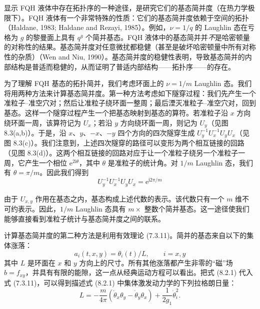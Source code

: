 显示 FQH 液体中存在拓扑序的一种途径，是研究它们的基态简并度（在热力学极限下）。FQH 液体有一个非常特殊的性质：它们的基态简并度依赖于空间的拓扑（Haldane, 1983; Haldane and Rezayi, 1985）。例如，$\nu = 1/q$ 的 Laughlin 态在亏格为 $g$ 的黎曼面上具有 $q^g$ 个简并基态。FQH 液体中的基态简并并\emph{不}是哈密顿量的对称性的结果。基态简并度对任意微扰都稳健（甚至是破坏哈密顿量中所有对称性的杂质）（Wen and Niu, 1990）。基态简并度的稳健性表明，导致基态简并的内部结构是普适而稳健的，从而证明了普适内部结构——拓扑序——的存在。

为了理解 FQH 基态的拓扑简并，我们考虑环面上的 $\nu = 1/m$ Laughlin 态。我们将用两种方法来计算基态简并度。第一种方法考虑如下隧穿过程：我们先产生一个准粒子--准空穴对；然后让准粒子绕环面一整周；最后湮灭准粒子--准空穴对，回到基态。这样一个隧穿过程产生一个把基态映射到基态的算符。若准粒子沿 $x$ 方向绕环面一周，该算符记为 $U_x$；若沿 $y$ 方向绕环面一周，则记为 $U_y$（见图 8.3(a,b)）。于是，沿 $x$、$y$、$-x$、$-y$ 四个方向的四次隧穿生成 $U_y^{-1}U_x^{-1}U_yU_x$（见图 8.3(c)）。我们注意到，上述四次隧穿的路径可以变形为两个相互链接的回路（见图 8.3(d)）。这两个相互链接的回路对应于让一个准粒子绕另一个准粒子一周，它产生一个相位 $\mathrm{e}^{2\mathrm{i}\theta}$，其中 $\theta$ 是准粒子的统计角。对 $1/m$ Laughlin 态，我们有 $\theta = \pi/m$。因此我们得到
\begin{equation*}
U_y^{-1}U_x^{-1}U_yU_x = \mathrm{e}^{\mathrm{i}2\pi/m}
\end{equation*}


由于 $U_{x,y}$ 作用在基态之内，基态构成上述代数的表示。该代数只有一个 $m$ 维不可约表示。因此，$1/m$ Laughlin 态具有 $m \times$ 整数个简并基态。这一途径使我们能够直接看到准粒子统计与基态简并度之间的联系。

计算基态简并度的第二种方法是利用有效理论 (7.3.11)。简并的基态来自以下的集体涨落：
\begin{equation*}
a_i(t, x, y) = \theta_i(t)/L, \qquad i = x, y \tag{8.2.1}
\end{equation*}
其中 $L$ 是环面在 $x$ 和 $y$ 方向上的尺寸。所有其他涨落都产生非零的“磁”场 $b = f_{xy}$，并具有有限的能隙，这一点从经典运动方程可以看出。把式 (8.2.1) 代入式 (7.3.11)，可以得到描述式 (8.2.1) 中集体激发动力学的下列拉格朗日量：
\begin{equation*}
L = - \frac{m}{4\pi} (\dot{\theta}_x \theta_y - \dot{\theta}_y \theta_x) + \frac{1}{2g_1} \dot{\theta}_i^2. \tag{8.2.2}
\end{equation*}

